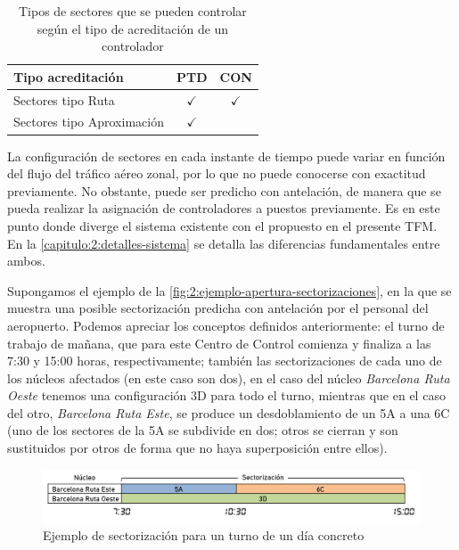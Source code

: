 \begin{table}[h]
	\centering
	\caption[Tipos de sectores según la acreditación del controlador]{Tipos de sectores que se pueden controlar según el tipo de acreditación de un controlador}
	\begin{tabular}{lcc}
		\hline
		\textbf{Tipo acreditación} & \textbf{PTD} & \textbf{CON} \\ \hline
		Sectores tipo Ruta         & $\checkmark$ & $\checkmark$ \\
		Sectores tipo Aproximación & $\checkmark$ &              \\ \hline
	\end{tabular}
	\label{table:2:acreditaciones}
\end{table}
%

La configuración de sectores en cada instante de tiempo puede variar en función del flujo del tráfico aéreo zonal, por lo que no puede conocerse con exactitud previamente. No obstante, puede ser predicho con antelación, de manera que se pueda realizar la asignación de controladores a puestos previamente.
Es en este punto donde diverge el sistema existente con el propuesto en el presente TFM\@.
En la \autoref{capitulo:2:detalles-sistema} se detalla las diferencias fundamentales entre ambos.

Supongamos el ejemplo de la \autoref{fig:2:ejemplo-apertura-sectorizaciones}, en la que se muestra una posible sectorización predicha con antelación por el personal del aeropuerto. Podemos apreciar los conceptos definidos anteriormente: el turno de trabajo de mañana, que para este \gls{Centro de Control} comienza y finaliza a las 7:30 y 15:00 horas, respectivamente; también las sectorizaciones de cada uno de los núcleos afectados (en este caso son dos), en el caso del núcleo \textit{Barcelona Ruta Oeste} tenemos una configuración 3D para todo el turno, mientras que en el caso del otro, \textit{Barcelona Ruta Este}, se produce un desdoblamiento de un 5A a una 6C (uno de los sectores de la 5A se subdivide en dos; otros se cierran y son sustituidos por otros de forma que no haya superposición entre ellos).

\begin{figure}[htbp]
	\centering
	\includegraphics[width=\linewidth]{ejemplo-apertura-sectorizaciones}
	\caption{Ejemplo de sectorización para un turno de un día concreto}
	\label{fig:2:ejemplo-apertura-sectorizaciones}
\end{figure}

